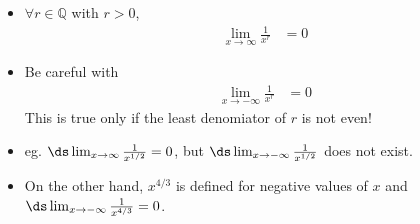\begin{itemize}
\item $\forall r\in\mathbb{Q}$ with $r > 0$,
\begin{align*}
\lim_{x \to \infty} \frac{1}{x^r} &= 0
\end{align*}
\item Be careful with
\begin{align*}
\lim_{x \to -\infty} \frac{1}{x^r} &= 0
\end{align*}
This is true only if the least denomiator of $r$ is not even!
\item eg. $\ds \lim_{x \to \infty} \frac{1}{x^{1/2}} = 0$, but $\ds \lim_{x \to -\infty} \frac{1}{x^{1/2}}$ does not exist.%
\item On the other hand, $x^{4/3}$ is defined for negative values of $x$ and $\ds \lim_{x \to -\infty} \frac{1}{x^{4/3}} = 0$.
\end{itemize}
